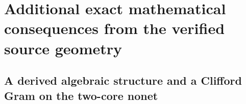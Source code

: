 \documentclass[12pt,a4paper]{article}
\begin{document}
\section{Additional exact mathematical consequences from the verified source geometry}


\subsection{A derived algebraic structure and a Clifford Gram on the two-core nonet}
\label{p11:subsec:v159-nonet-algebra-clifford}
\end{document}
